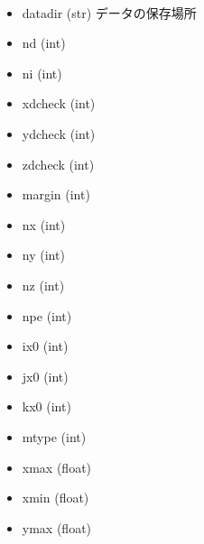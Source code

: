 \documentclass[letterpaper,10pt,dvipdfmx,report]{sphinxmanual}
\begin{document}
\begin{fulllineitems}
\label{\detokenize{notation:R2D2.p}}~\begin{itemize}
\item {} 
datadir (str) \sphinxhyphen{}\sphinxhyphen{} データの保存場所

\item {} 
nd (int) \sphinxhyphen{}\sphinxhyphen{}

\item {} 
ni (int) \sphinxhyphen{}\sphinxhyphen{}

\item {} 
xdcheck (int) \sphinxhyphen{}\sphinxhyphen{}

\item {} 
ydcheck (int) \sphinxhyphen{}\sphinxhyphen{}

\item {} 
zdcheck (int) \sphinxhyphen{}\sphinxhyphen{}

\item {} 
margin (int) \sphinxhyphen{}\sphinxhyphen{}

\item {} 
nx (int) \sphinxhyphen{}\sphinxhyphen{}

\item {} 
ny (int) \sphinxhyphen{}\sphinxhyphen{}

\item {} 
nz (int) \sphinxhyphen{}\sphinxhyphen{}

\item {} 
npe (int) \sphinxhyphen{}\sphinxhyphen{}

\item {} 
ix0 (int) \sphinxhyphen{}\sphinxhyphen{}

\item {} 
jx0 (int) \sphinxhyphen{}\sphinxhyphen{}

\item {} 
kx0 (int) \sphinxhyphen{}\sphinxhyphen{}

\item {} 
mtype (int) \sphinxhyphen{}\sphinxhyphen{}

\item {} 
xmax (float) \sphinxhyphen{}\sphinxhyphen{}

\item {} 
xmin (float) \sphinxhyphen{}\sphinxhyphen{}

\item {} 
ymax (float) \sphinxhyphen{}\sphinxhyphen{}


\end{itemize}
\end{fulllineitems}
\end{document}
